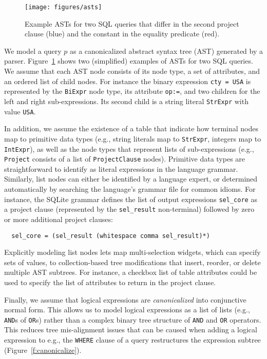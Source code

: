\begin{figure}[h]
\centering
\texttt{[image: figures/asts]}
\caption{\small Example ASTs for two SQL queries that differ in the second project clause (blue) and the constant in the equality predicate (red). }
\label{f:asts}
\end{figure}
We model a query $p$ as a canonicalized abstract syntax tree (AST) generated by a parser.  Figure~\ref{f:asts} shows two (simplified) examples of ASTs for two SQL queries.
We assume that each AST node consists of its node type, a set of attributes, and an ordered list of child nodes.  For instance the binary expression \texttt{cty = USA} is represented by the \texttt{BiExpr} node type, its attribute \texttt{op:=}, and two children for the left and right sub-expressions.  Its second child is a string literal \texttt{StrExpr} with value \texttt{USA}.

In addition, we assume the existence of a table that indicate how terminal nodes map to primitive data types (e.g., string literals map to \texttt{StrExpr}, integers map to \texttt{IntExpr}), as well as the node types that represent lists of sub-expressions (e.g., \texttt{Project} consists of a list of \texttt{ProjectClause} nodes).  Primitive data types are straightforward to identify as literal expressions in the language grammar.  Similarly, list nodes can either be identified by a language expert, or determined automatically by searching the language's grammar file for common idioms.  For instance, the SQLite grammar defines the list of output expressions \texttt{sel\_core} as a project clause (represented by the \texttt{sel\_result} non-terminal) followed by zero or more additional project clauses:
{\small
  \begin{verbatim}
  sel_core = (sel_result (whitespace comma sel_result)*)\end{verbatim}
}
Explicitly modeling list nodes lets \sys map multi-selection widgets, which can specify sets of values, to collection-based tree modifications that insert, reorder, or delete multiple AST subtrees.  For instance, a checkbox list of table attributes could be used to specify the list of attributes to return in the project clause.

Finally, we assume that logical expressions are {\it canonicalized} into conjunctive normal form.  This allows us to model logical expressions as a list of lists (e.g., \texttt{AND}s of \texttt{OR}s) rather than a complex binary tree structure of \texttt{AND} and \texttt{OR} operators.  This reduces tree mis-alignment issues that can be caused when adding a logical expression to e.g., the \texttt{WHERE} clause of a query restructures the expression subtree (Figure~\ref{f:canonicalize}).

